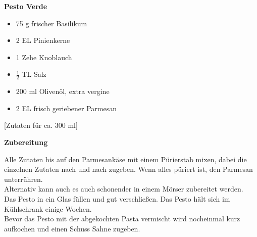 
\parindent0pt	

\pagestyle{empty}


\textbf{{\LARGE Pesto Verde}}%


\hrulefill
\vspace*{\fill}
\begin{multicols}{2}	


\begin{itemize}
\item 75 g 	frischer Basilikum 
\item 2 EL 	Pinienkerne
\item 1 Zehe 	Knoblauch
\item $\frac{1}{2}$ TL 	Salz
\item 200 ml 	Olivenöl, extra vergine
\item 2 EL 	frisch geriebener Parmesan

\end{itemize}

\end{multicols}

\vspace{1cm}
\begin{center}
[Zutaten für ca. 300 ml]
\end{center}

\vfill
\newpage
\textbf{{\LARGE Zubereitung}}%

\hrulefill

\vspace*{\fill}
\begin{multicols}{2}

Alle Zutaten bis auf den Parmesankäse mit einem Pürierstab mixen, dabei die einzelnen Zutaten nach und nach zugeben. 
Wenn alles püriert ist, den Parmesan unterrühren.\\
Alternativ kann auch es auch schonender in einem Mörser zubereitet werden.\\

Das Pesto in ein Glas füllen und gut verschließen.
Das Pesto hält sich im Kühlschrank einige Wochen.\\

Bevor das Pesto mit der abgekochten Pasta vermischt wird nocheinmal kurz aufkochen und einen Schuss Sahne zugeben. 

\end{multicols}
\vfill
